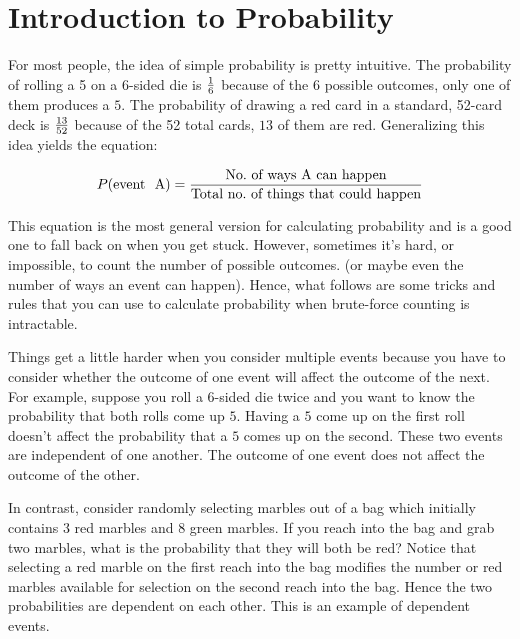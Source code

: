 \chapter{Introduction to Probability}
 \label{chap:probability} 

  For most people, the idea of simple
 probability is pretty intuitive.  The probability of rolling a 5 on a
 6-sided die is ${ 1\over 6}$ because of the $6$ possible outcomes,
 only one of them produces a $5$.  The probability of drawing a red
 card in a standard, 52-card deck is ${13\over 52}$ because of the 52
 total cards, $13$ of them are red.  Generalizing this idea yields the
 equation:

\begin{equation}\label{eq:simpleProb}
  P(\text{event~ A}) = {\text{No.~of~ways~A~can~happen}\over \text{Total~no.~of~things~that~could~happen}}
\end{equation}


This equation is the most general version for calculating probability
and is a good one to fall back on when you get stuck.  However,
sometimes it's hard, or impossible, to count the number of possible
outcomes. (or maybe even the number of ways an event can
happen). Hence, what follows are some tricks and rules that you can
use to calculate probability when brute-force counting is intractable.


Things get a little harder when you consider multiple events because
you have to consider whether the outcome of one event will affect the
outcome of the next.  For example, suppose you roll a $6$-sided
die twice and you want to know the probability that both rolls come up $5$.
Having a $5$ come up on the first roll doesn't affect the probability
that a $5$ comes up on the second.  These two events are independent
of one another.  The outcome of one event does not affect the outcome
of the other.

In contrast, consider randomly selecting marbles out of a bag which initially
contains $3$ red marbles and $8$ green marbles.  If you reach into the
bag and grab two marbles, what is the probability that they will both
be red?  Notice that selecting a red marble on the first reach into the bag
modifies the number or red marbles available for selection on the
second reach into the bag. Hence the two probabilities are dependent
on each other.  This is an example of dependent events.

